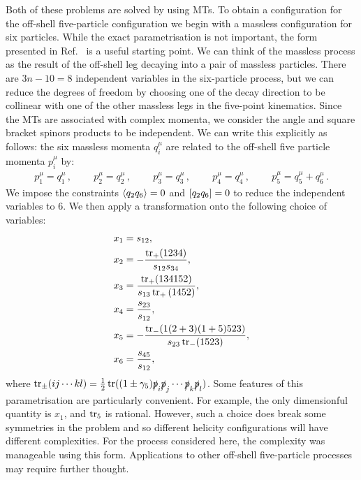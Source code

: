 \documentclass[main.tex]{subfiles}
\begin{document}
Both of these problems are solved by using MTs. To obtain a configuration for the off-shell five-particle configuration we begin with a massless configuration for six particles. While the exact parametrisation is not important, the form presented in Ref.~\cite{Badger:2016uuq} is a useful starting point. We can think of the massless process as the result of the off-shell leg decaying into a pair of massless particles. There are $3n-10 = 8$ independent variables in the six-particle process, but we can reduce the degrees of freedom by choosing one of the decay direction to be collinear with one of the other massless legs in the five-point kinematics. Since the MTs are associated with complex momenta, we consider the angle and square bracket spinors products to be independent. We can write this explicitly as follows: the six massless momenta $q_i^\mu$ are related to the off-shell five particle momenta $p_i^\mu$ by:
\begin{align}
  p_1^\mu = q_1^\mu\,, \ \qquad 
  p_2^\mu = q_2^\mu\,, \ \qquad 
  p_3^\mu = q_3^\mu\,, \ \qquad
  p_4^\mu = q_4^\mu \,, \ \qquad
  p_5^\mu = q_5^\mu+q_6^\mu \,.
\end{align}
We impose the constraints $\langle q_2q_6\rangle = 0 $ and $[q_2q_6] = 0$ to reduce the independent variables to 6. 
We then apply a transformation onto the following choice of variables:
\begin{equation}
\begin{aligned}
  x_1 &= s_{12}, \\
  x_2 &= -\frac{\operatorname{\rm tr}_+(1234)}{s_{12}s_{34}}, \\
  x_3 &= \frac{\operatorname{\rm tr}_+(134152)}{s_{13}\operatorname{\rm tr}_+{(1452)}}, \\
  x_4 &= \frac{s_{23}}{s_{12}}, \\
  x_5 &= -\frac{\operatorname{\rm tr}_-(1(2+3)(1+5)523)}{s_{23}\operatorname{\rm tr}_-(1523)}, \\
  x_6 &= \frac{s_{45}}{s_{12}},
\end{aligned}
\label{eq:mtvardefs}
\end{equation}
where $\operatorname{\rm tr}_{\pm}(ij \cdots kl) = \frac{1}{2} \operatorname{\rm tr}((1\pm\gamma_5)\slashed{p}_i\slashed{p}_j \cdots\slashed{p}_k\slashed{p}_l)$.
Some features of this parametrisation are particularly convenient. For example, the only dimensionful 
quantity is $x_1$, and $\operatorname{\rm tr}_5$ is rational. However, such a choice does break some symmetries
in the problem and so different helicity configurations will have different complexities. For the
process considered here, the complexity was manageable using this form.
Applications to other off-shell five-particle processes may require further thought. 
\end{document}
